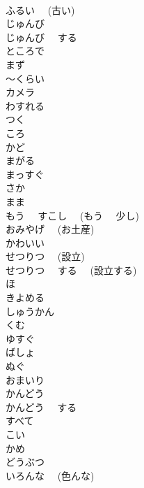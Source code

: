 \documentclass[8pt]{extreport}
\begin{document}
\begin{CJK}{UTF8}{min}
\\	ふるい　 (古い)	
\\	じゅんび	
\\	じゅんび　 する	
\\	ところで	
\\	まず	
\\	～くらい	
\\	カメラ	
\\	わすれる	
\\	つく	
\\	ころ	
\\	かど	
\\	まがる	
\\	まっすぐ	
\\	さか	
\\	まま	
\\	もう　 すこし　 (もう　 少し)	
\\	おみやげ　 (お土産)	
\\	かわいい	
\\	せつりつ　 (設立)	
\\	せつりつ　 する　 (設立する)	
\\	ほ	
\\	きよめる	
\\	しゅうかん	
\\	くむ	
\\	ゆすぐ	
\\	ばしょ	
\\	ぬぐ	
\\	おまいり	
\\	かんどう	
\\	かんどう　 する	
\\	すべて	
\\	こい	
\\	かめ	
\\	どうぶつ	
\\	いろんな　 (色んな)	
\end{CJK}
\end{document}
